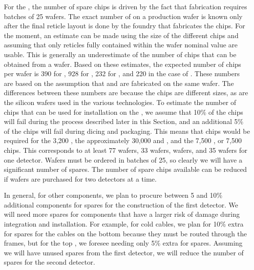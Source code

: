 For the , the number of
spare chips is driven by the fact that fabrication requires
batches of 25 wafers. The exact number of  
on a production wafer is known only after the final reticle layout
is done by the foundry that fabricates the chips. For the moment,
an estimate can be made using the size of the different 
chips and assuming that only reticles fully contained
within the wafer nominal value are usable. This is generally
an underestimate of the number of chips that can be obtained 
from a wafer. Based on these estimates, the expected number
of chips per wafer is 390 for , 928 for , 
232 for , and 220 in the case of . 
These numbers are based on the assumption that 
and  are fabricated on the same wafer.
The differences between these numbers are because the chips 
are different sizes, as are the silicon wafers used in the various 
technologies. To estimate the number of chips that can be
used for installation on the , we assume that 10\% of 
the chips will fail during the 
process described later in this Section, and an additional
5\% of the chips will fail during dicing and packaging. This means
that chips would be required for the 3,200 , the approximately 30,000  and
, and the 7,500 , or 7,500
 chips. This corresponds to at least 77  wafers,
33  wafers,  wafers, and 35  wafers for one
 detector. Wafers must be ordered
in batches of 25, so clearly we will have a significant number of
spares. The number of spare chips available can be 
reduced if wafers are purchased for two  detectors at a time. 

In general, for other components, we plan to procure between 5 and
10\% additional components for spares for the construction of the first 
detector. We will need more spares for components that have
a larger risk of damage during integration and 
installation. For example, for cold cables, we
plan for 10\% extra for spares for the cables on the bottom  because
they must be routed through the  frames, but
for the top , we foresee needing only 5\% extra for spares.
Assuming we will have unused spares from the first detector, we will reduce the number of spares for the second 
detector.

